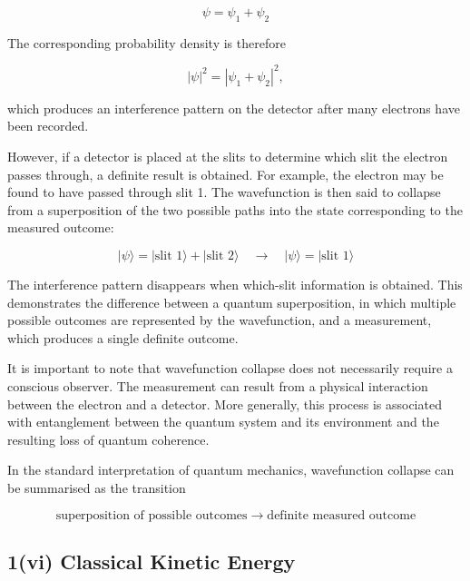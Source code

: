 \documentclass{article}
\begin{document}
\begin{equation*}
\psi = \psi_1 + \psi_2
\end{equation*}

The corresponding probability density is therefore

\begin{equation*}
|\psi|^2 = |\psi_1 + \psi_2|^2,
\end{equation*}

which produces an interference pattern on the detector after many electrons have been recorded.

\vspace{1\baselineskip}

However, if a detector is placed at the slits to determine which slit the electron passes through, a definite result is obtained. For example, the electron may be found to have passed through slit 1. The wavefunction is then said to collapse from a superposition of the two possible paths into the state corresponding to the measured outcome:

\begin{equation*}
|\psi\rangle = |\text{slit 1}\rangle + |\text{slit 2}\rangle \quad \longrightarrow \quad |\psi\rangle = |\text{slit 1}\rangle
\end{equation*}

The interference pattern disappears when which-slit information is obtained. This demonstrates the difference between a quantum superposition, in which multiple possible outcomes are represented by the wavefunction, and a measurement, which produces a single definite outcome.

It is important to note that wavefunction collapse does not necessarily require a conscious observer. The measurement can result from a physical interaction between the electron and a detector. More generally, this process is associated with entanglement between the quantum system and its environment and the resulting loss of quantum coherence.

In the standard interpretation of quantum mechanics, wavefunction collapse can be summarised as the transition

\begin{equation*}
\boxed{\text{superposition of possible outcomes} \;\longrightarrow\; \text{definite measured outcome}}
\end{equation*}


\subsection*{1(vi) Classical Kinetic Energy}
\end{document}
